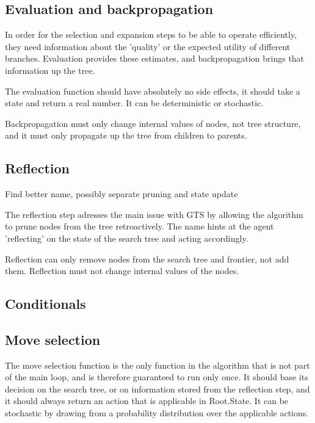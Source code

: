 \subsection{Evaluation and backpropagation}

In order for the selection and expansion steps to be able to
operate efficiently, they need information about the 'quality'
or the expected utility of different branches. Evaluation provides
these estimates, and backpropagation brings that information
up the tree.

The evaluation function should have absolutely no side effects, it
should take a state and return a real number. It can be deterministic
or stochastic.

Backpropagation must only change internal values of nodes, not
tree structure, and it must only propagate up the tree from
children to parents.

\subsection{Reflection}
\todo Find better name, possibly separate pruning and state update

The reflection step adresses the main issue with GTS by allowing
the algorithm to prune nodes from the tree retroactively. The name 
hints at the agent 'reflecting' on the state of the search tree and 
acting accordingly. 

Reflection can only remove nodes from the search tree and frontier,
not add them. Reflection must not change internal values of the nodes.

\subsection{Conditionals}


\subsection{Move selection}
The move selection function is the only function in the algorithm
that is not part of the main loop, and is therefore guaranteed to
run only once. It should base its decision on the search tree, or
on information stored from the reflection step, and it should always
return an action that is applicable in Root.State.
It can be stochastic by drawing from a probability distribution over
the applicable actions.
